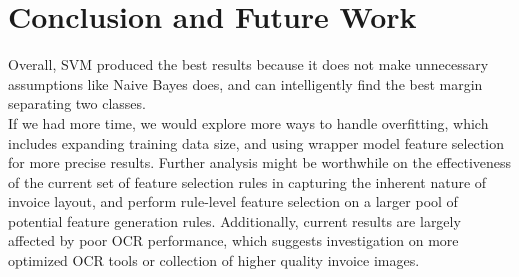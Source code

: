 \section{Conclusion and Future Work}
Overall, SVM produced the best results because it does not make unnecessary assumptions like Naive Bayes does, and can intelligently find the best margin separating two classes.\\

If we had more time, we would explore more ways to handle overfitting, which includes expanding training data size, and using wrapper model feature selection for more precise results. Further analysis might be worthwhile on the effectiveness of the current set of feature selection rules in capturing the inherent nature of invoice layout, and perform rule-level feature selection on a larger pool of potential feature generation rules. Additionally, current results are largely affected by poor OCR performance, which suggests investigation on more optimized OCR tools or collection of higher quality invoice images.